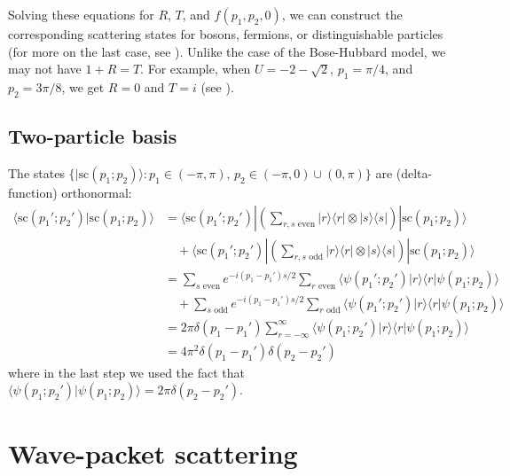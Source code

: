 \documentclass[../thesis-main/thesis-main]{subfiles}
\begin{document}
Solving these equations for $R$, $T$, and $f(p_1,p_2,0)$, we can construct the corresponding scattering states for bosons, fermions, or distinguishable particles (for more on the last case, see ). Unlike the case of the Bose-Hubbard model, we may not have $1+R=T$. For example, when $U=-2-\sqrt{2}$, $p_1={\pi}/{4}$, and $p_2={3\pi}/{8}$, we get $R=0$ and $T=i$ (see ).

\subsection{Two-particle basis}



The states $\{|\mathrm{sc}(p_1;p_2)\rangle \colon p_1\in (-\pi,\pi),\,p_2\in(-\pi,0)\cup(0,\pi)\}$ are (delta-function) orthonormal:
\begin{align*}
\langle  \mathrm{sc}(p_1';p_2')|\mathrm{sc}(p_1;p_2)\rangle &= \langle \mathrm{sc}(p_1'; p_2')|\left(\sum_{\text{$r,s$ even}}|r\rangle\langle r| \otimes |s\rangle \langle s| \right)|\mathrm{sc}(p_1;p_2)\rangle\\
&\quad + \langle \mathrm{sc}(p_1'; p_2')|\left(\sum_{\text{$r,s$ odd}}|r\rangle \langle r|\otimes  |s\rangle \langle s|\right)|\mathrm{sc}(p_1;p_2)\rangle\\
&= \sum_{\text{$s$ even}} e^{-i(p_1-p_1') {s}/{2}}\sum_{\text{$r$ even}}\langle \psi(p_1';p_2')|r\rangle\langle r|\psi(p_1;p_2)\rangle \\
& \quad + \sum_{\text{$s$ odd}} e^{-i(p_1-p_1') {s}/{2}}\sum_{\text{$r$ odd}}\langle  \psi(p_1';p_2')|r\rangle\langle r|\psi(p_1;p_2)\rangle\\
&= 2\pi \delta(p_1-p_1') \sum_{r=-\infty}^{\infty}\langle \psi(p_1;p_2')|r\rangle\langle r|\psi(p_1;p_2)\rangle\\
&= 4\pi^2 \delta(p_1-p_1')\delta(p_2-p_2')
\end{align*}
where in the last step we used the fact that $\langle\psi(p_1;p_2')|\psi(p_1;p_2)\rangle=2\pi\delta(p_2-p_2')$.


\section{Wave-packet scattering}

\end{document}
